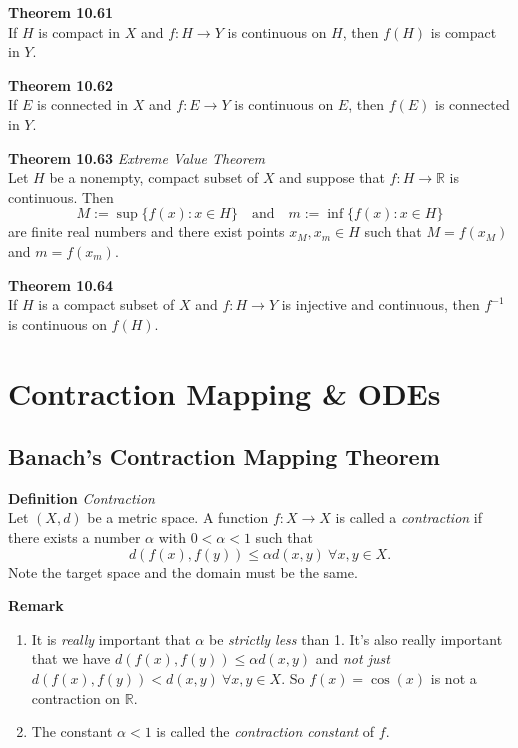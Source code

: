\documentclass[8pt,landscape]{article}
\begin{document}
\begin{multicols}{3}
\textbf{Theorem 10.61} \\
If $H$ is compact in $X$ and $f : H \to Y$ is continuous on $H$,
then $f(H)$ is compact in $Y$.

\textbf{Theorem 10.62} \\
If $E$ is connected in $X$ and $f : E \to Y$ is continuous on $E$,
then $f(E)$ is connected in $Y$.

\textbf{Theorem 10.63} \emph{Extreme Value Theorem} \\
Let $H$ be a nonempty, compact subset of $X$ and suppose that $f : H \to \mathbb{R}$
is continuous.
Then
\[
    M := \sup \{ f(x) : x \in H \} \quad \text{and} \quad
    m := \inf \{ f(x) : x \in H \}
\]
are finite real numbers and there exist points $x_M, x_m \in H$ such that
$M = f(x_M)$ and $m = f(x_m)$.


\textbf{Theorem 10.64} \\
If $H$ is a compact subset of $X$ and $f : H \to Y$ is injective and continuous,
then $f^{-1}$ is continuous on $f(H)$.

\section{Contraction Mapping \& ODEs}

\subsection{Banach's Contraction Mapping Theorem}

\textbf{Definition} \emph{Contraction} \\
Let $(X, d)$ be a metric space.
A function $f : X \to X$ is called a \emph{contraction} if there exists a number
$\alpha$ with $0 < \alpha < 1$ such that
\[
    d(f(x), f(y)) \leq \alpha d(x, y) \ \forall x, y \in X.
\]
Note the target space and the domain must be the same.

\textbf{Remark} \begin{enumerate}
    \item It is \emph{really} important that $\alpha$ be \emph{strictly less} than 1.
        It's also really important that we have $d(f(x), f(y)) \leq \alpha d(x, y)$
        and \emph{not just} $d(f(x), f(y)) < d(x, y) \ \forall x, y \in X$.
        So $f(x) = \cos(x)$ is not a contraction on $\mathbb{R}$.
    \item The constant $\alpha < 1$ is called the \emph{contraction constant} of $f$.
\end{enumerate}


\end{multicols}
\end{document}
